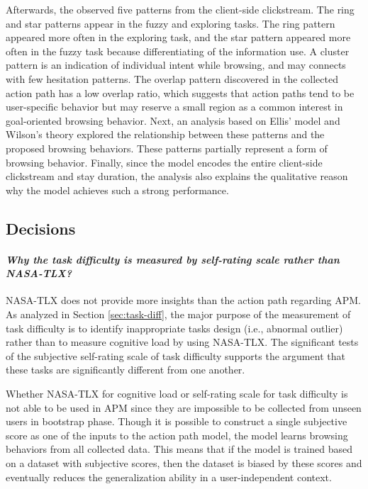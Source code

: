 Afterwards, the observed five patterns from the client-side clickstream. 
The ring and star patterns appear in the fuzzy and exploring tasks. 
The ring pattern appeared more often in the exploring task,
and the star pattern appeared more often in the fuzzy task 
because differentiating of the information use.
A cluster pattern is an indication of individual intent while browsing, and may connects
with few hesitation patterns.
The overlap pattern discovered in the collected action path has a low overlap ratio,
which suggests that action paths tend to be user-specific behavior but may reserve a small region as
a common interest in goal-oriented browsing behavior.
Next, an analysis based on Ellis' model and Wilson's theory explored the relationship 
between these patterns and the proposed browsing behaviors. These patterns partially represent a form of browsing behavior.
Finally, since the model encodes the entire client-side clickstream and stay duration,
the analysis also explains the qualitative reason why the model achieves such a strong performance.

\subsection{Decisions}
\label{sec:decision}

\paragraph{\emph{Why the task difficulty is measured by self-rating scale rather than NASA-TLX?}}

NASA-TLX does not provide more insights than the action path regarding APM.
As analyzed in Section \ref{sec:task-diff}, the major purpose of the measurement of 
task difficulty is to identify inappropriate tasks design (i.e., abnormal outlier) 
rather than to measure cognitive load by using NASA-TLX.
The significant tests of the subjective self-rating scale of task difficulty supports
the argument that these tasks are significantly different from one another.

Whether NASA-TLX for cognitive load or self-rating scale for task difficulty is not able to be used in
APM since they are impossible to be collected from unseen users in bootstrap phase.
Though it is possible to construct a single subjective score as one of the inputs to the action path model,
the model learns browsing behaviors from all collected data. This means that if the model is trained based on 
a dataset with subjective scores, then the dataset is biased by these scores and eventually reduces the 
generalization ability in a user-independent context.

